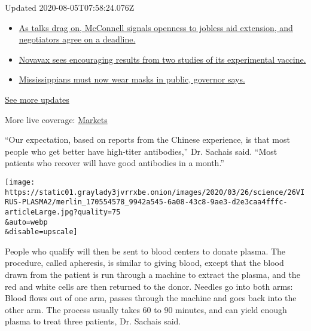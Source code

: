 Updated 2020-08-05T07:58:24.076Z

\begin{itemize}
\tightlist
\item
  \href{https://www.nytimes3xbfgragh.onion/2020/08/04/world/coronavirus-cases.html?action=click\&pgtype=Article\&state=default\&region=MAIN_CONTENT_1\&context=storylines_live_updates\#link-762df92}{As
  talks drag on, McConnell signals openness to jobless aid extension,
  and negotiators agree on a deadline.}
\item
  \href{https://www.nytimes3xbfgragh.onion/2020/08/04/world/coronavirus-cases.html?action=click\&pgtype=Article\&state=default\&region=MAIN_CONTENT_1\&context=storylines_live_updates\#link-1228a480}{Novavax
  sees encouraging results from two studies of its experimental
  vaccine.}
\item
  \href{https://www.nytimes3xbfgragh.onion/2020/08/04/world/coronavirus-cases.html?action=click\&pgtype=Article\&state=default\&region=MAIN_CONTENT_1\&context=storylines_live_updates\#link-794484ed}{Mississippians
  must now wear masks in public, governor says.}
\end{itemize}

\href{https://www.nytimes3xbfgragh.onion/2020/08/04/world/coronavirus-cases.html?action=click\&pgtype=Article\&state=default\&region=MAIN_CONTENT_1\&context=storylines_live_updates}{See
more updates}

More live coverage:
\href{https://www.nytimes3xbfgragh.onion/live/2020/08/04/business/stock-market-today-coronavirus?action=click\&pgtype=Article\&state=default\&region=MAIN_CONTENT_1\&context=storylines_live_updates}{Markets}

``Our expectation, based on reports from the Chinese experience, is that
most people who get better have high-titer antibodies,'' Dr. Sachais
said. ``Most patients who recover will have good antibodies in a
month.''

\texttt{[image: https://static01.graylady3jvrrxbe.onion/images/2020/03/26/science/26VIRUS-PLASMA2/merlin\_170554578\_9942a545-6a08-43c8-9ae3-d2e3caa4fffc-articleLarge.jpg?quality=75\\\&auto=webp\\\&disable=upscale]}

People who qualify will then be sent to blood centers to donate plasma.
The procedure, called apheresis, is similar to giving blood, except that
the blood drawn from the patient is run through a machine to extract the
plasma, and the red and white cells are then returned to the donor.
Needles go into both arms: Blood flows out of one arm, passes through
the machine and goes back into the other arm. The process usually takes
60 to 90 minutes, and can yield enough plasma to treat three patients,
Dr. Sachais said.


